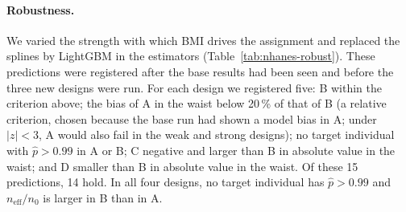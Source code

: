 \documentclass[11pt,a4paper]{article}
\newcommand{\neff}{n_{\mathrm{eff}}}
\theoremstyle{plain}
\theoremstyle{definition}
\begin{document}
\begin{table}[ht]
\centering
\caption{NHANES, robustness (200 replications each). Mean bias of the DR estimator in the waist (cm) and, in the last two columns, in blood pressure (BP). For B, the registered prediction and the $z$ of the deviation are given in parentheses.}\label{tab:nhanes-robust}
\end{table}

\paragraph{Robustness.} We varied the strength with which BMI drives the assignment and replaced the splines by LightGBM in the estimators (Table~\ref{tab:nhanes-robust}). These predictions were registered after the base results had been seen and before the three new designs were run. For each design we registered five: B within the criterion above; the bias of A in the waist below 20\,\% of that of B (a relative criterion, chosen because the base run had shown a model bias in A; under $|z|<3$, A would also fail in the weak and strong designs); no target individual with $\hat p>0.99$ in A or B; C negative and larger than B in absolute value in the waist; and D smaller than B in absolute value in the waist. Of these 15 predictions, 14 hold. In all four designs, no target individual has $\hat p>0.99$ and $\neff/n_0$ is larger in B than in A.
\end{document}
